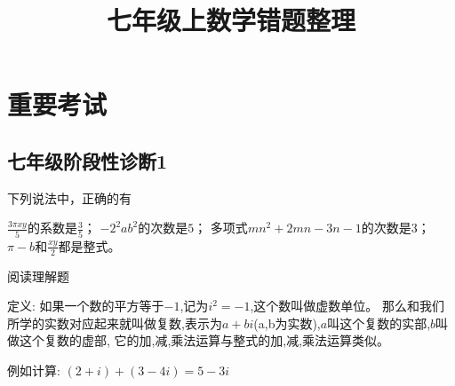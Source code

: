 \documentclass[answers]{exam} %
\title{七年级上数学错题整理}
\newcommand\epart{\part}
\begin{document}
\maketitle

\section{重要考试}

\subsection{七年级阶段性诊断1}

\begin{questions}
\question
下列说法中，正确的有\fillin
  
\begin{oneparchoices}
  \choice $\frac{3 \pi xy}{5}$的系数是$\frac{3}{5}$；
  \correctchoice $-2^2ab^2$的次数是$5$；
  \choice 多项式$mn^2+2mn-3n-1$的次数是$3$；
  \choice $\pi - b$和$\frac{xy}{2}$都是整式。
\end{oneparchoices}

\question
阅读理解题

定义:
如果一个数的平方等于$-1$,记为$i^2=-1$,这个数叫做虚数单位。
那么和我们所学的实数对应起来就叫做复数,表示为$a+bi$(a,b为实数),$a$叫这个复数的实部,$b$叫做这个复数的虚部,
它的加,减,乘法运算与整式的加,减,乘法运算类似。

例如计算: $(2+i) + (3-4i)=5-3i$

\end{questions}
\end{document}
